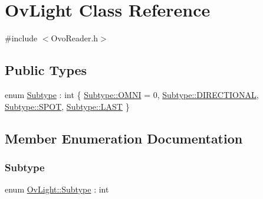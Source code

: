 \hypertarget{classOvLight}{}\section{Ov\+Light Class Reference}
\label{classOvLight}


{\ttfamily \#include $<$Ovo\+Reader.\+h$>$}

\subsection*{Public Types}
\begin{DoxyCompactItemize}
\item 
enum \hyperlink{classOvLight_a1019edb0540a20be7581a2b38d439016}{Subtype} \+: int \{ \hyperlink{classOvLight_a1019edb0540a20be7581a2b38d439016a63389071b9b8e84b1c40330b2eeecac0}{Subtype\+::\+O\+M\+NI} = 0, 
\hyperlink{classOvLight_a1019edb0540a20be7581a2b38d439016ab6f2249394a4def60a78b342dcc925b9}{Subtype\+::\+D\+I\+R\+E\+C\+T\+I\+O\+N\+AL}, 
\hyperlink{classOvLight_a1019edb0540a20be7581a2b38d439016a5bac85a0c611ddef64ab0dfb383056f4}{Subtype\+::\+S\+P\+OT}, 
\hyperlink{classOvLight_a1019edb0540a20be7581a2b38d439016af447f5c03508de4d88e340390ba7c78f}{Subtype\+::\+L\+A\+ST}
 \}
\end{DoxyCompactItemize}


\subsection{Member Enumeration Documentation}
\mbox{\label{classOvLight_a1019edb0540a20be7581a2b38d439016}} 
\subsubsection{\texorpdfstring{Subtype}{Subtype}}
{\footnotesize\ttfamily enum \hyperlink{classOvLight_a1019edb0540a20be7581a2b38d439016}{Ov\+Light\+::\+Subtype} \+: int\hspace{0.3cm}{\ttfamily [strong]}}

